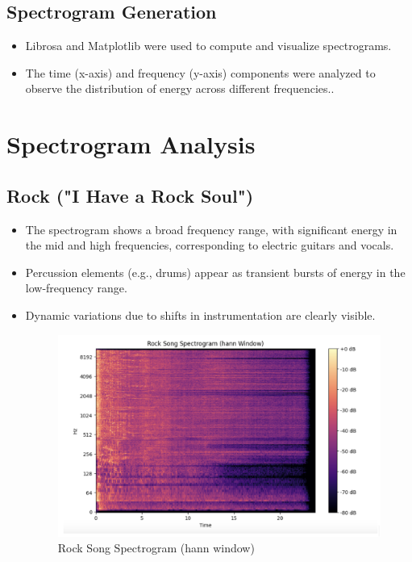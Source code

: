 \documentclass[a4paper,12pt]{article}
\begin{document}
\subsection{Spectrogram Generation}
\begin{itemize}
\item Librosa and Matplotlib were used to compute and visualize spectrograms.
\item The time (x-axis) and frequency (y-axis) components were analyzed to observe the distribution of energy across different frequencies..
\end{itemize}
\newpage
\section{Spectrogram Analysis}
\subsection{Rock ("I Have a Rock Soul")}
\begin{itemize}
\item The spectrogram shows a broad frequency range, with significant energy in the mid and high frequencies, corresponding to electric guitars and vocals.
\item Percussion elements (e.g., drums) appear as transient bursts of energy in the low-frequency range.
\item Dynamic variations due to shifts in instrumentation are clearly visible.
\begin{figure}[H]
    \centering
    \includegraphics[width=1\linewidth]{RockSG.png}
    \caption{Rock Song Spectrogram (hann window)}
    \label{fig:enter-label}
\end{figure}
\end{itemize}
\newpage
\end{document}
